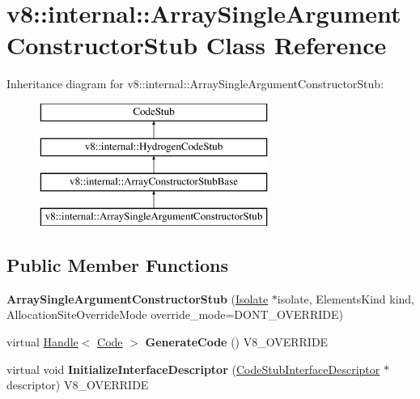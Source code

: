 \hypertarget{classv8_1_1internal_1_1_array_single_argument_constructor_stub}{}\section{v8\+:\+:internal\+:\+:Array\+Single\+Argument\+Constructor\+Stub Class Reference}
\label{classv8_1_1internal_1_1_array_single_argument_constructor_stub}
Inheritance diagram for v8\+:\+:internal\+:\+:Array\+Single\+Argument\+Constructor\+Stub\+:\begin{figure}[H]
\begin{center}
\leavevmode
\includegraphics[height=4.000000cm]{classv8_1_1internal_1_1_array_single_argument_constructor_stub}
\end{center}
\end{figure}
\subsection*{Public Member Functions}
\begin{DoxyCompactItemize}
\item 
\hypertarget{classv8_1_1internal_1_1_array_single_argument_constructor_stub_a0cd99a369645effeaa12c445b17084bc}{}{\bfseries Array\+Single\+Argument\+Constructor\+Stub} (\hyperlink{classv8_1_1internal_1_1_isolate}{Isolate} $\ast$isolate, Elements\+Kind kind, Allocation\+Site\+Override\+Mode override\+\_\+mode=D\+O\+N\+T\+\_\+\+O\+V\+E\+R\+R\+I\+D\+E)\label{classv8_1_1internal_1_1_array_single_argument_constructor_stub_a0cd99a369645effeaa12c445b17084bc}

\item 
\hypertarget{classv8_1_1internal_1_1_array_single_argument_constructor_stub_aea6bf06235f89ea4f16f8059ae13b72d}{}virtual \hyperlink{classv8_1_1internal_1_1_handle}{Handle}$<$ \hyperlink{classv8_1_1internal_1_1_code}{Code} $>$ {\bfseries Generate\+Code} () V8\+\_\+\+O\+V\+E\+R\+R\+I\+D\+E\label{classv8_1_1internal_1_1_array_single_argument_constructor_stub_aea6bf06235f89ea4f16f8059ae13b72d}

\item 
\hypertarget{classv8_1_1internal_1_1_array_single_argument_constructor_stub_a33d2afc327f85d7cb96c7b1f49c8bb4f}{}virtual void {\bfseries Initialize\+Interface\+Descriptor} (\hyperlink{classv8_1_1internal_1_1_code_stub_interface_descriptor}{Code\+Stub\+Interface\+Descriptor} $\ast$descriptor) V8\+\_\+\+O\+V\+E\+R\+R\+I\+D\+E\label{classv8_1_1internal_1_1_array_single_argument_constructor_stub_a33d2afc327f85d7cb96c7b1f49c8bb4f}

\end{DoxyCompactItemize}
